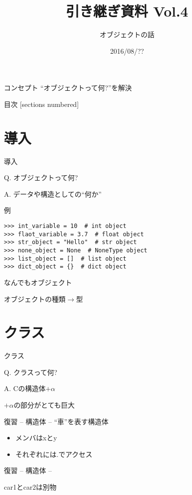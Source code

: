 \documentclass[12pt, xetex, xcolor=pdftex, dvipsnames]{beamer}
\title{引き継ぎ資料 Vol.4}
\subtitle{オブジェクトの話}
\date{2016/08/??}
\author{}
\institute{}
\begin{document}
\maketitle
\begin{frame}{コンセプト}
    ``オブジェクトって何?''を解決
\end{frame}
\begin{frame}{目次}
  [sections numbered]
  \tableofcontents[hideallsubsections]
\end{frame}

\section{導入}
\begin{frame}{導入}
    \begin{block}{Q.}
        {\Large オブジェクトって何?}
    \end{block}
    \pause
    \begin{alertblock}{A.}
        データや構造としての``何か''
    \end{alertblock}
\end{frame}
\begin{frame}[fragile]{例}
\begin{lstlisting}
>>> int_variable = 10  # int object
>>> flaot_variable = 3.7  # float object
>>> str_object = "Hello"  # str object
>>> none_object = None  # NoneType object
>>> list_object = []  # list object
>>> dict_object = {}  # dict object
\end{lstlisting}
\pause
なんでもオブジェクト

オブジェクトの種類$\rightarrow$型
\end{frame}

\section{クラス}
\begin{frame}{クラス}
    \begin{block}{Q.}
        {\Large クラスって何?}
    \end{block}
    \pause
    \begin{alertblock}{A.}
        Cの構造体{\Huge\alert{$+\alpha$}}

        \pause
        $+\alpha$の部分がとても巨大
    \end{alertblock}
\end{frame}
\begin{frame}[fragile]{復習 -- 構造体 --}
    ``車''を表す構造体

    

    \begin{itemize}
        \item メンバはxとy
        \item それぞれには.でアクセス
    \end{itemize}
\end{frame}
\begin{frame}[fragile]{復習 -- 構造体 --}
    

    car1とcar2は別物
\end{frame}
\end{document}
